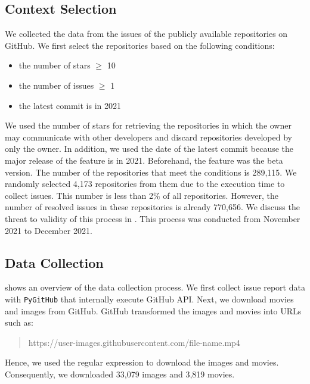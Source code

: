\subsection{Context Selection}
We collected the data from the issues of 
the publicly available repositories on GitHub. 
We first select the repositories based on the following conditions:
\begin{itemize}
	\item the number of stars $\geq$ 10
	\item the number of issues $\geq$ 1
	\item the latest commit is in 2021
\end{itemize}
We used the number of stars for retrieving the repositories 
in which the owner may communicate with other developers and 
discard repositories developed by only the owner. 
In addition, we used the date of the latest commit 
because the major release of the feature is in 2021. 
Beforehand, the feature was the beta version. 
The number of the repositories that meet 
the conditions is 289,115. 
We randomly selected 4,173 repositories from them 
due to the execution time to collect issues. 
This number is less than 2\% of all repositories. 
However, the number of resolved issues 
in these repositories is already 770,656. 
We discuss the threat to validity of 
this process in . 
This process was conducted from November 2021 to December 2021.



\subsection{Data Collection}
 shows an overview of 
the data collection process. 
We first collect issue report data with \texttt{PyGitHub} 
that internally execute GitHub API. 
Next, we download movies and images from GitHub.
GitHub transformed the images and movies into URLs such as:
\begin{quote}
	https://user-images.githubusercontent.com/file-name.mp4
	\\
\end{quote}
Hence, we used the regular expression 
to download the images and movies. 
Consequently, we downloaded 33,079 images and 3,819 movies. 

